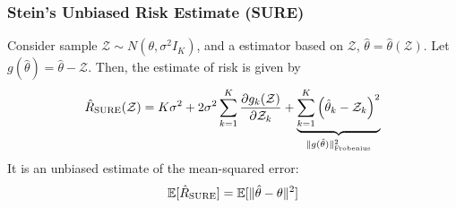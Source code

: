 \documentclass[11pt]{elegantbook}
\begin{document}
\subsubsection{Stein's Unbiased Risk Estimate (SURE)}
Consider sample $\mathcal{Z}\sim N(\theta,\sigma^2 I_K)$, and a estimator based on $\mathcal{Z}$, $\hat{\theta}=\hat{\theta}(\mathcal{Z})$. Let $g(\hat{\theta})=\hat{\theta}-\mathcal{Z}$. Then, the estimate of risk is given by
\begin{equation}
    \begin{aligned}
        \hat{R}_\textnormal{SURE}(\mathcal{Z})=K\sigma^2+2\sigma^2\sum_{k=1}^K \frac{\partial g_k(\mathcal{Z})}{\partial \mathcal{Z}_k}+\underbrace{\sum_{k=1}^K\left(\hat{\theta}_k- \mathcal{Z}_k\right)^2}_{\|g(\hat{\theta})\|_\text{Frobenius}^2}
    \end{aligned}
    \nonumber
\end{equation}
It is an unbiased estimate of the mean-squared error:
\begin{equation}
    \begin{aligned}
        \mathbb{E}[\hat{R}_\textnormal{SURE}]=\mathbb{E}[\|\hat{\theta}-\theta\|^2]
    \end{aligned}
    \nonumber
\end{equation}
\end{document}
